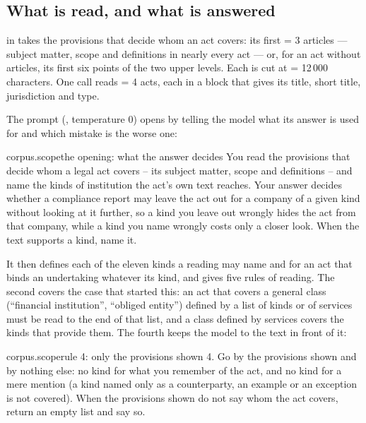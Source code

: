 \subsection{What is read, and what is answered}

 in  takes the provisions that decide whom an
act covers: its first  = 3 articles --- subject matter, scope and
definitions in nearly every act --- or, for an act without articles, its first six points of
the two upper levels. Each is cut at  = 12\,000 characters. One call reads
 = 4 acts, each in a block that gives its title, short title,
jurisdiction and type.

The prompt (, temperature 0) opens by telling the model what its answer
is used for and which mistake is the worse one:

\begin{promptexcerpt}{corpus.scope}{the opening: what the answer decides}
You read the provisions that decide whom a legal act covers – its subject matter, scope and definitions – and name the kinds of institution the act's own text reaches. Your answer decides whether a compliance report may leave the act out for a company of a given kind without looking at it further, so a kind you leave out wrongly hides the act from that company, while a kind you name wrongly costs only a closer look. When the text supports a kind, name it.
\end{promptexcerpt}

It then defines each of the eleven kinds a reading may name and  for an act that
binds an undertaking whatever its kind, and gives five rules of reading. The second covers
the case that started this: an act that covers a general class (\enquote{financial
institution}, \enquote{obliged entity}) defined by a list of kinds or of services must be
read to the end of that list, and a class defined by services covers the kinds that provide
them. The fourth keeps the model to the text in front of it:

\begin{promptexcerpt}{corpus.scope}{rule 4: only the provisions shown}
4. Go by the provisions shown and by nothing else: no kind for what you remember of the act, and no kind for a mere mention (a kind named only as a counterparty, an example or an exception is not covered). When the provisions shown do not say whom the act covers, return an empty list and say so.
\end{promptexcerpt}

